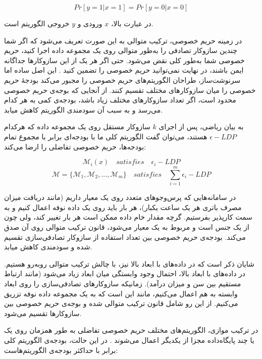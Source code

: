\begin{equation}
Pr[y = 1 | x = 1] = Pr[y = 0 | x = 0] 
\end{equation}

در عبارت بالا، $x$ ورودی و $y$ خروجی الگوریتم است.


در زمینه حریم خصوصی، ترکیب متوالی به این صورت تعریف می‌شود که اگر شما چندین سازوکار تصادفی را به‌طور متوالی روی یک مجموعه داده اجرا کنید، حریم خصوصی شما به‌طور کلی نقض می‌شود. حتی اگر هر یک از این سازوکار‌ها جداگانه ایمن باشند، در نهایت نمی‌توانید حریم خصوصی را تضمین کنید . این اصل ساده اما سرنوشت‌ساز، طراحان الگوریتم‌های حریم خصوصی را مجبور می‌کند بودجهٔ حریم خصوصی را میان سازوکارهای مختلف تقسیم کنند. از آنجایی که بوجه‌ی حریم خصوصی محدود است، اگر تعداد سازوکارهای مختلف زیاد باشد، بودجه‌ی کمی به هر کدام می‌رسد و به سبب آن سودمندی الگوریتم کاهش میابد.

به بیان ریاضی، پس از اجرای $k$ سازوکار مستقل روی یک مجموعه داده که هرکدام $\epsilon{-}LDP$ هستند، می‌توان گفت الگوریتم کلی ما با بودجه‌ای برابر با مجموع تمام بودجه‌ها، حریم خصوصی تفاضلی را ارضا می‌کند:

$$\mathcal{M}_i(x) \quad satisfies \quad \epsilon_i{-}LDP$$
$$\mathcal{M} = \{ \mathcal{M}_1 , \mathcal{M}_2 , ... , \mathcal{M}_m \} \quad satisfies \quad \sum_{i=1}^{m} \epsilon_i{-}LDP$$

در سامانه‌هایی که پرس‌و‌جو‌های متعدد روی یک معیار داریم (مانند دریافت میزان مصرف باتری هر یک ساعت یکبار)، هر بار باید روی یک داده نوفه اعمال کنیم و به سمت کارپذیر بفرستیم. گرچه مقدار خام داده ممکن است هر بار تغییر کند، ولی چون از یک جنس است و مربوط به یک معیار می‌شود، قانون ترکیب متوالی روی آن صدق می‌کند. بودجه‌ی حریم خصوصی بین تعداد استفاده از سازوکار تصادفی‌سازی تقسیم شده و سودمندی کاهش میابد.

شایان ذکر است که در داده‌های با ابعاد بالا نیز، با چالش ترکیب متوالی روبه‌رو هستیم. در داده‌های با ابعاد بالا، احتمال وجود وابستگی میان ابعاد زیاد می‌شود (مانند ارتباط مستقیم بین سن و میزان درآمد). زمانیکه سازوکارهای تصادفی‌سازی را روی ابعاد وابسته به هم اعمال می‌کنیم، مانند این است که به یک مجموعه داده نوفه تزریق می‌کنیم. از این رو شامل قانون ترکیب متوالی شده و بوجه‌ی حریم خصوصی بین سازوکارها تقسیم می‌شود.


در ترکیب موازی، الگوریتم‌های مختلف حریم خصوصی تفاضلی به طور همزمان روی یک یا چند پایگاه‌داده مجزا  از یکدیگر اعمال می‌شوند . در این حالت، بودجه‌ی الگوریتم کلی برابر با حداکثر بودجه‌ی الگوریتم‌هاست:


